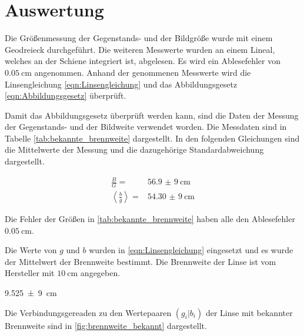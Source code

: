 \section{Auswertung}

Die Größenmessung der Gegenstands- und der Bildgröße wurde mit einem Geodreieck durchgeführt.
Die weiteren Messwerte wurden an einem Lineal, welches an der Schiene integriert
ist, abgelesen. Es wird ein Ablesefehler von $\SI{0,05}{\centi\meter}$ angenommen.
Anhand der genommenen Messwerte wird die Linsengleichung \eqref{eqn:Linsengleichung} und das
Abbildungsgesetz \eqref{eqn:Abbildungsgesetz} überprüft.

Damit das Abbildungsgesetz überprüft werden kann, sind die Daten der Messung
der Gegenstands- und der Bildweite verwendet worden.
Die Messdaten sind in Tabelle \ref{tab:bekannte_brennweite} dargestellt.
In den folgenden Gleichungen sind die Mittelwerte der Messung und die dazugehörige
Standardabweichung dargestellt.

\begin{align}
  \label{eqn:B/G}
  \frac{B}{G}=&\SI{56,9(9)}{\centi\meter} \\
  \label{eqn:b/g}
  \left<\frac{b}{g}\right>=&\SI{54,30(9)}{\centi\meter}
\end{align}



Die Fehler der Größen in \ref{tab:bekannte_brennweite} haben alle den Ablesefehler
$\SI{0,05}{\centi\meter}$.

Die Werte von $g$ und $b$ wurden in \eqref{eqn:Linsengleichung} eingesetzt und es wurde der Mittelwert der Brennweite bestimmt. Die Brennweite der Linse ist vom Hersteller mit $\SI{10}{\centi\meter}$
angegeben.

\begin{description}
  \centering
  \item[$<f_1>\ua{gemessen}=$]\SI{9,525(9)}{\centi\meter}
\end{description}

Die Verbindungsgereaden zu den Wertepaaren $(g_i|b_i)$ der Linse mit bekannter
Brennweite sind in \ref{fig:brennweite_bekannt}
dargestellt.


